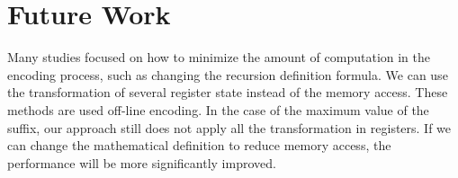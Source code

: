 \section{Future Work}
\label{sec:Future}

Many studies focused on how to minimize the amount of computation in the
encoding process, such as changing the recursion definition formula.  We
can use the transformation of several register state instead of the
memory access.  These methods are used off-line encoding. In the case of
the maximum value of the suffix,  our approach still does not apply all
the transformation in registers.  If we can change the mathematical
definition to reduce memory access, the performance will be more
significantly improved.

